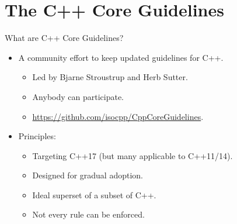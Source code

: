 \section{The C++ Core Guidelines}

\begin{frame}[t]{What are C++ Core Guidelines?}
\begin{itemize}
  \item A community effort to keep updated guidelines for C++.
    \begin{itemize}
      \item Led by Bjarne Stroustrup and Herb Sutter.
      \item Anybody can participate.
      \item \url{https://github.com/isocpp/CppCoreGuidelines}.
    \end{itemize}

  \item Principles:
    \begin{itemize}
      \item Targeting C++17 (but many applicable to C++11/14).
      \item Designed for gradual adoption.
      \item Ideal superset of a subset of C++.
      \item Not every rule can be enforced.
    \end{itemize}
\end{itemize}
\end{frame}
